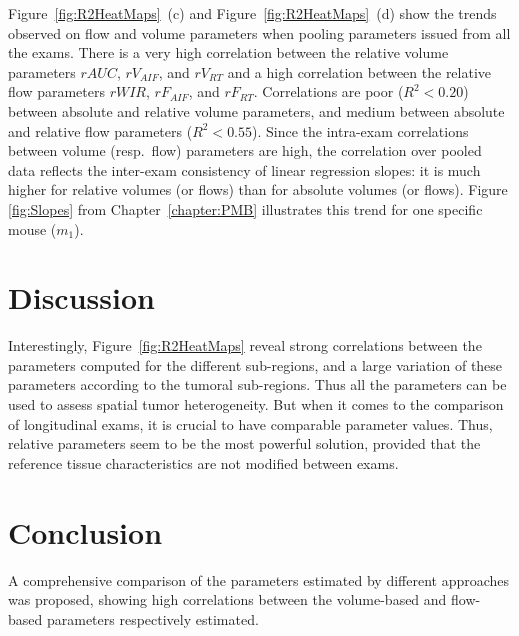 Figure~\ref{fig:R2HeatMaps}~(c) and Figure~\ref{fig:R2HeatMaps}~(d) show the trends observed on flow and volume parameters when pooling parameters issued from all the exams. There is a very high correlation between the relative volume parameters $rAUC$, $rV_{AIF}$, and $rV_{RT}$ and a high correlation between the relative flow parameters $rWIR$, $rF_{AIF}$, and $rF_{RT}$. Correlations are poor ($R^2 < 0.20$) between absolute and relative volume parameters, and medium between absolute and relative flow parameters ($R^2< 0.55$). Since the intra-exam correlations between volume (resp.~flow) parameters are high, the correlation over pooled data reflects the inter-exam consistency of linear regression slopes: it is much higher for relative volumes (or flows) than for absolute volumes (or flows). Figure \ref{fig:Slopes} from Chapter~\ref{chapter:PMB} illustrates this trend for one specific mouse ($m_1$). 

\section{Discussion}
Interestingly, Figure~\ref{fig:R2HeatMaps} reveal strong correlations between the parameters computed for the different sub-regions, and a large variation of these parameters according to the tumoral sub-regions. Thus all the parameters can be used to assess spatial tumor heterogeneity. But when it comes to the comparison of longitudinal exams, it is crucial to have comparable parameter values. Thus, relative parameters seem to be the most powerful solution, provided that the reference tissue characteristics are not modified between exams.

\section{Conclusion}
A comprehensive comparison of the parameters estimated by different approaches was proposed, showing high correlations between the volume-based and flow-based parameters respectively estimated.